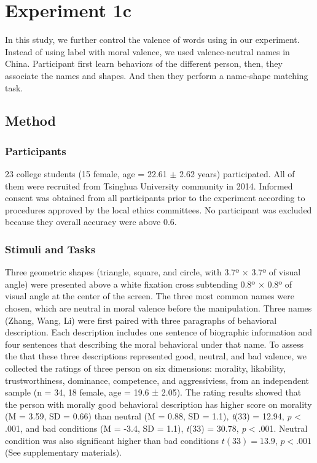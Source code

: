 \documentclass[
  english,
  man]{apa6}
\begin{document}
\hypertarget{experiment-1c}{%
\section{Experiment 1c}\label{experiment-1c}}

In this study, we further control the valence of words using in our experiment. Instead of using label with moral valence, we used valence-neutral names in China. Participant first learn behaviors of the different person, then, they associate the names and shapes. And then they perform a name-shape matching task.

\hypertarget{method-1}{%
\subsection{Method}\label{method-1}}

\hypertarget{participants-2}{%
\subsubsection{Participants}\label{participants-2}}

23 college students (15 female, age = 22.61 \(\pm\) 2.62 years) participated. All of them were recruited from Tsinghua University community in 2014. Informed consent was obtained from all participants prior to the experiment according to procedures approved by the local ethics committees. No participant was excluded because they overall accuracy were above 0.6.

\hypertarget{stimuli-and-tasks-2}{%
\subsubsection{Stimuli and Tasks}\label{stimuli-and-tasks-2}}

Three geometric shapes (triangle, square, and circle, with 3.7º × 3.7º of visual angle) were presented above a white fixation cross subtending 0.8º × 0.8º of visual angle at the center of the screen. The three most common names were chosen, which are neutral in moral valence before the manipulation.
Three names (Zhang, Wang, Li) were first paired with three paragraphs of behavioral description. Each description includes one sentence of biographic information and four sentences that describing the moral behavioral under that name. To assess the that these three descriptions represented good, neutral, and bad valence, we collected the ratings of three person on six dimensions: morality, likability, trustworthiness, dominance, competence, and aggressiviess, from an independent sample (n = 34, 18 female, age = 19.6 ± 2.05). The rating results showed that the person with morally good behavioral description has higher score on morality (M = 3.59, SD = 0.66) than neutral (M = 0.88, SD = 1.1), \emph{t}(33) = 12.94, \emph{p} \textless{} .001, and bad conditions (M = -3.4, SD = 1.1), \emph{t}(33) = 30.78, \emph{p} \textless{} .001. Neutral condition was also significant higher than bad conditions \(t(33) = 13.9\), \(p < .001\) (See supplementary materials).
\end{document}
